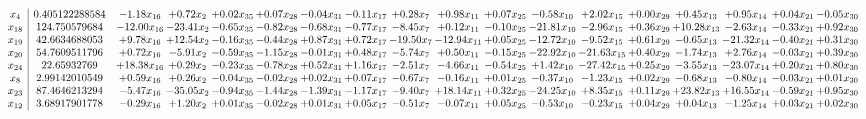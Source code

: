 \documentclass[9pt]{article}
\begin{document}
 \[\begin{array}{c| c c@{\hskip 2pt} c@{\hskip 2pt} c@{\hskip 2pt} c@{\hskip 2pt} c@{\hskip 2pt} c@{\hskip 2pt} c@{\hskip 2pt} c@{\hskip 2pt} c@{\hskip 2pt} c@{\hskip 2pt} c@{\hskip 2pt} c@{\hskip 2pt} c@{\hskip 2pt} c@{\hskip 2pt} c@{\hskip 2pt} c@{\hskip 2pt} }
 x_{4}   &  0.405122288584 & -1.18 x_{16} & +  0.72 x_{2} & +  0.02 x_{35} & +  0.07 x_{28} & -0.04 x_{31} & -0.11 x_{17} & +  0.28 x_{7} & +  0.98 x_{11} & +  0.07 x_{25} & -0.58 x_{10} & +  2.02 x_{15} & +  0.00 x_{29} & +  0.45 x_{13} & +  0.95 x_{14} & +  0.04 x_{21} & -0.05 x_{30}\\
 x_{18}   &  124.750579684 & -12.00 x_{16} & -23.41 x_{2} & -0.65 x_{35} & -0.82 x_{28} & -0.68 x_{31} & -0.77 x_{17} & -8.45 x_{7} & +  0.12 x_{11} & -0.10 x_{25} & -21.81 x_{10} & -2.96 x_{15} & +  0.36 x_{29} & + 10.28 x_{13} & -2.63 x_{14} & -0.33 x_{21} & +  0.92 x_{30}\\
 x_{19}   &  42.6634688053 & +  9.78 x_{16} & + 12.54 x_{2} & -0.16 x_{35} & -0.44 x_{28} & +  0.87 x_{31} & +  0.72 x_{17} & -19.50 x_{7} & -12.94 x_{11} & +  0.05 x_{25} & -12.72 x_{10} & -9.52 x_{15} & +  0.61 x_{29} & -0.65 x_{13} & -21.32 x_{14} & -0.40 x_{21} & +  0.31 x_{30}\\
 x_{20}   &  54.7609511796 & +  0.72 x_{16} & -5.91 x_{2} & -0.59 x_{35} & -1.15 x_{28} & -0.01 x_{31} & +  0.48 x_{17} & -5.74 x_{7} & +  0.50 x_{11} & -0.15 x_{25} & -22.92 x_{10} & -21.63 x_{15} & +  0.40 x_{29} & -1.74 x_{13} & +  2.76 x_{14} & -0.03 x_{21} & +  0.39 x_{30}\\
 x_{24}   &  22.65932769 & + 18.38 x_{16} & +  0.29 x_{2} & -0.23 x_{35} & -0.78 x_{28} & +  0.52 x_{31} & +  1.16 x_{17} & -2.51 x_{7} & -4.66 x_{11} & -0.54 x_{25} & +  1.42 x_{10} & -27.42 x_{15} & +  0.25 x_{29} & -3.55 x_{13} & -23.07 x_{14} & +  0.20 x_{21} & +  0.80 x_{30}\\
 x_{8}   &  2.99142010549 & +  0.59 x_{16} & +  0.26 x_{2} & -0.04 x_{35} & -0.02 x_{28} & +  0.02 x_{31} & +  0.07 x_{17} & -0.67 x_{7} & -0.16 x_{11} & +  0.01 x_{25} & -0.37 x_{10} & -1.23 x_{15} & +  0.02 x_{29} & -0.68 x_{13} & -0.80 x_{14} & -0.03 x_{21} & +  0.01 x_{30}\\
 x_{23}   &  87.4646213294 & -5.47 x_{16} & -35.05 x_{2} & -0.94 x_{35} & -1.44 x_{28} & -1.39 x_{31} & -1.17 x_{17} & -9.40 x_{7} & + 18.14 x_{11} & +  0.32 x_{25} & -24.25 x_{10} & +  8.35 x_{15} & +  0.11 x_{29} & + 23.82 x_{13} & + 16.55 x_{14} & -0.59 x_{21} & +  0.95 x_{30}\\
 x_{12}   &  3.68917901778 & -0.29 x_{16} & +  1.20 x_{2} & +  0.01 x_{35} & -0.02 x_{28} & +  0.01 x_{31} & +  0.05 x_{17} & -0.51 x_{7} & -0.07 x_{11} & +  0.05 x_{25} & -0.53 x_{10} & -0.23 x_{15} & +  0.04 x_{29} & +  0.04 x_{13} & -1.25 x_{14} & +  0.03 x_{21} & +  0.02 x_{30}\\

\end{array}\]
\end{document}
